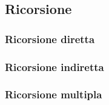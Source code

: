     \subsection{Ricorsione}

        \subsubsection{Ricorsione diretta}

        \subsubsection{Ricorsione indiretta}
        
        \subsubsection{Ricorsione multipla}

